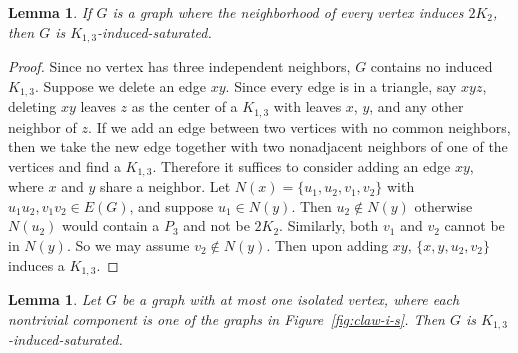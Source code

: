 \documentclass[12pt]{amsart}
\theoremstyle{plain}
\newtheorem{lemma}[thm]{Lemma}
\theoremstyle{definition}
\theoremstyle{remark}
\newcommand{\claw}{\ensuremath{K_{1,3}}\xspace}
\begin{document}
\begin{lemma}\label{suff_claw}
If $G$ is a graph where the neighborhood of every vertex induces $2K_2$, then $G$ is \claw-induced-saturated.
\end{lemma}
\begin{proof}
Since no vertex has three independent neighbors, $G$ contains no induced \claw.   Suppose we delete an edge $xy$.
Since every edge is in a triangle, say $xyz$, deleting $xy$ leaves $z$ as the center of a \claw with leaves $x$, $y$, and any other neighbor of $z$.
If we add an edge between two vertices with no common neighbors, then we take the new edge together with two nonadjacent neighbors of one of the vertices and find a \claw.
Therefore it suffices to consider adding an edge $xy$, where $x$ and $y$ share a neighbor.
Let $N(x)=\{u_1,u_2,v_1,v_2\}$ with $u_1u_2,v_1v_2 \in E(G)$, and suppose $u_1 \in N(y)$.
Then $u_2 \notin N(y)$ otherwise $N(u_2)$ would contain a $P_3$ and not be $2K_2$.  Similarly, both $v_1$ and $v_2$ cannot be in $N(y)$.  So we may assume $v_2 \notin N(y)$.  Then upon adding $xy$, $\{x,y,u_2,v_2\}$ induces a \claw.
\end{proof}

\begin{lemma}
Let $G$ be a graph with at most one isolated vertex, where each nontrivial  component is one of the graphs in Figure~\ref{fig:claw-i-s}.  Then $G$ is \claw-induced-saturated.
\end{lemma}
\end{document}
